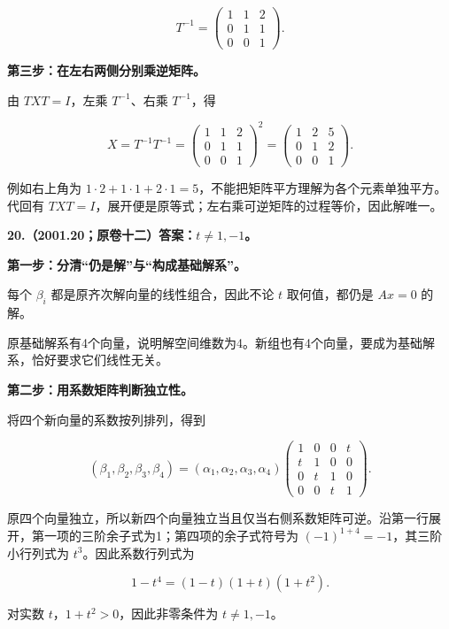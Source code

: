 \documentclass[UTF8,11pt,fontset=windows]{ctexart}
\begin{document}
$$
T^{-1}=\begin{pmatrix}1&1&2\\0&1&1\\0&0&1\end{pmatrix}.
$$

\textbf{第三步：在左右两侧分别乘逆矩阵。}

由 $TXT=I$，左乘 $T^{-1}$、右乘 $T^{-1}$，得

$$
X=T^{-1}T^{-1}
=\begin{pmatrix}1&1&2\\0&1&1\\0&0&1\end{pmatrix}^{2}
=\boxed{\begin{pmatrix}1&2&5\\0&1&2\\0&0&1\end{pmatrix}}.
$$

例如右上角为 $1\cdot2+1\cdot1+2\cdot1=5$，不能把矩阵平方理解为各个元素单独平方。代回有 $TXT=I$，展开便是原等式；左右乘可逆矩阵的过程等价，因此解唯一。

\clearpage

\textbf{20.（2001.20；原卷十二）答案：$t\ne1,-1$。}

\textbf{第一步：分清“仍是解”与“构成基础解系”。}

每个 $\beta_i$ 都是原齐次解向量的线性组合，因此不论 $t$ 取何值，都仍是 $Ax=0$ 的解。

原基础解系有4个向量，说明解空间维数为4。新组也有4个向量，要成为基础解系，恰好要求它们线性无关。

\textbf{第二步：用系数矩阵判断独立性。}

将四个新向量的系数按列排列，得到

$$
(\beta_1,\beta_2,\beta_3,\beta_4)
=(\alpha_1,\alpha_2,\alpha_3,\alpha_4)
\begin{pmatrix}1&0&0&t\\t&1&0&0\\0&t&1&0\\0&0&t&1\end{pmatrix}.
$$

原四个向量独立，所以新四个向量独立当且仅当右侧系数矩阵可逆。沿第一行展开，第一项的三阶余子式为1；第四项的余子式符号为 $(-1)^{1+4}=-1$，其三阶小行列式为 $t^3$。因此系数行列式为

$$
1-t^4=(1-t)(1+t)(1+t^2).
$$

对实数 $t$，$1+t^2>0$，因此非零条件为 $t\ne1,-1$。
\end{document}

